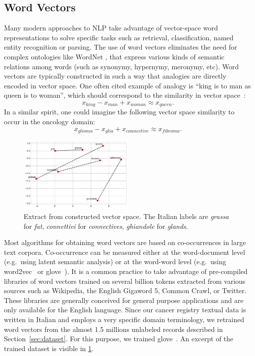 \subsection{Word Vectors}
\label{sec:word-vectors}
Many modern approaches to NLP take advantage of vector-space word
representations to solve specific tasks such as retrieval,
classification, named entity recognition or parsing. %
The use of word vectors eliminates the need for complex ontologies
like WordNet \cite{fellbaum-wordnet-1998}, that express various kinds of semantic relations among
words (such as synonymy, hypernymy, meronymy, etc). Word vectors are
typically constructed in such a way that analogies are directly
encoded in vector space. One often cited example of analogy is ``king
is to man as queen is to woman'', which should correspond to the
similarity in vector space~\cite{mikolov_linguistic_2013}:
$$
x_\mathit{king}-x_\mathit{man}+x_\mathit{woman} \approx x_\mathit{queen}.
$$
In a similar spirit, one could imagine the following vector space
similarity to occur in the oncology domain:
$$
x_\mathit{glioma}-x_\mathit{glia}+x_\mathit{connective} \approx
x_\mathit{fibroma}.
$$
\begin{figure}
  \centering
  \includegraphics[width=0.5\textwidth]{img/gloveGraph.pdf}
  \caption{Extract from constructed vector space. The Italian labels
    are \emph{grassa} for \emph{fat}, \emph{connettivi} for
    \emph{connectives}, \emph{ghiandole} for \emph{glands}.}
  \label{fig:gloveGraph}
\end{figure}

Most algorithms for obtaining word vectors are based on co-occurrences
in large text corpora. Co-occurrence can be measured either at the
word-document level (e.g.\ using latent semantic analysis) or at the
word-word level (e.g.\ using word2vec~\cite{mikolov_linguistic_2013}
or \ac{glove}~\cite{pennington_glove:_2014}). It is a common practice to
take advantage of pre-compiled libraries of word vectors trained on
several billion tokens extracted from various sources such as
Wikipedia, the English Gigaword 5, Common Crawl, or Twitter. These
libraries are generally conceived for general purpose applications and
are only available for the English language. Since our cancer registry
textual data is written in Italian and employs a very specific domain
terminology, we retrained word vectors from the almost 1.5 millions
unlabeled records described in Section~\ref{sec:dataset}. For this
purpose, we trained \ac{glove}~\cite{pennington_glove:_2014}. An
excerpt of the trained dataset is visible in \cref{fig:gloveGraph}.

